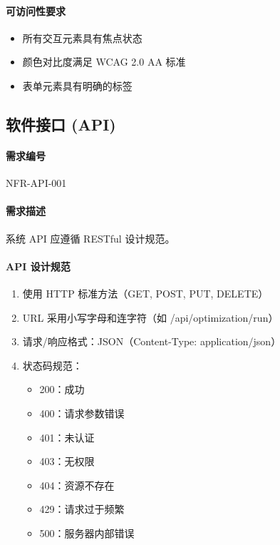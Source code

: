 \paragraph{可访问性要求}
\begin{itemize}
    \item 所有交互元素具有焦点状态
    \item 颜色对比度满足 WCAG 2.0 AA 标准
    \item 表单元素具有明确的标签
\end{itemize}

\subsection{软件接口 (API)}

\paragraph{需求编号} NFR-API-001

\paragraph{需求描述} 系统 API 应遵循 RESTful 设计规范。

\paragraph{API 设计规范}
\begin{enumerate}
    \item 使用 HTTP 标准方法（GET, POST, PUT, DELETE）
    \item URL 采用小写字母和连字符（如 /api/optimization/run）
    \item 请求/响应格式：JSON（Content-Type: application/json）
    \item 状态码规范：
          \begin{itemize}
              \item 200：成功
              \item 400：请求参数错误
              \item 401：未认证
              \item 403：无权限
              \item 404：资源不存在
              \item 429：请求过于频繁
              \item 500：服务器内部错误
          \end{itemize}
\end{enumerate}

